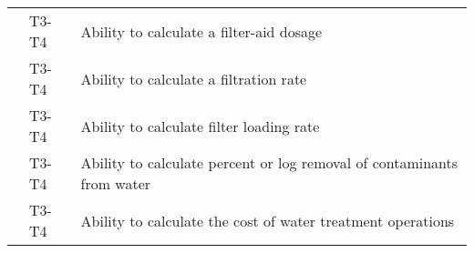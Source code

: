 \begin{table}[H]
\begin{tabular}{| m{1cm} | m{1cm} | m{12cm} |}
\multicolumn{1}{l|}{} & \multicolumn{1}{l|}{T3-T4} & Ability to calculate   a filter-aid dosage                                   \\ \cline{2-3} 
\multicolumn{1}{l|}{} & \multicolumn{1}{l|}{T3-T4} & Ability to calculate   a filtration rate                                     \\ \cline{2-3} 
\multicolumn{1}{l|}{} & \multicolumn{1}{l|}{T3-T4} & Ability to calculate   filter loading rate                                   \\ \cline{2-3} 
\multicolumn{1}{l|}{} & \multicolumn{1}{l|}{T3-T4} & Ability to calculate   percent or log removal of contaminants from water     \\ \cline{2-3} 
\multicolumn{1}{l|}{} & \multicolumn{1}{l|}{T3-T4} & Ability to calculate   the cost of water treatment operations                \\ \cline{2-3} 
\end{tabular}
\end{table}
\newpage










